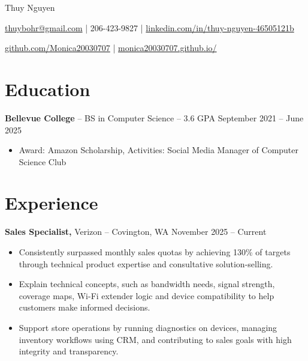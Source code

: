 \documentclass[11pt]{article}       %
\begin{document}
\centerline{\Huge Thuy Nguyen}

\vspace{5pt}

\centerline{\href{mailto:thuybohr@gmail.com}{thuybohr@gmail.com} | 206-423-9827 |
\href{https://www.linkedin.com/in/thuy-nguyen-46505121b/}{linkedin.com/in/thuy-nguyen-46505121b}}

\centerline{\href{https://github.com/Monica20030707}{github.com/Monica20030707} | 
\href{https://monica20030707.github.io/}{monica20030707.github.io/}} 

\vspace{-9pt}

\section*{Education}
\textbf{Bellevue College} -- BS in Computer Science -- 3.6 GPA \hfill September 2021 -- June 2025\\
\vspace{-9pt}
\begin{itemize}
  \item Award: Amazon Scholarship, Activities: Social Media Manager of Computer Science Club
\end{itemize}

\vspace{-18.5pt}

\section*{Experience}

\textbf{Sales Specialist,} {Verizon} -- Covington, WA \hfill November 2025 -- Current \\
\vspace{-9pt}
\begin{itemize}
  \item Consistently surpassed monthly sales quotas by achieving 130\% of targets through technical product expertise and consultative solution-selling.
  \item Explain technical concepts, such as bandwidth needs, signal strength, coverage maps, Wi-Fi extender logic and device compatibility to help customers make informed decisions.
  \item Support store operations by running diagnostics on devices, managing inventory workflows using CRM, and contributing to sales goals with high integrity and transparency.
\end{itemize}
\end{document}
